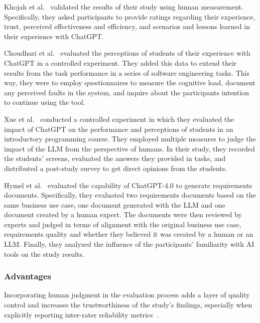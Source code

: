 Khojah et al.~\cite{DBLP:journals/pacmse/KhojahM0N24} validated the results of their study using human measurement.
Specifically, they asked participants to provide ratings regarding their experience, trust, perceived effectiveness and efficiency, and scenarios and lessons learned in their experience with ChatGPT.

Choudhuri et al.~\cite{DBLP:conf/icse/ChoudhuriLSGS24} evaluated the perceptions of students of their experience with ChatGPT in a controlled experiment.
They added this data to extend their results from the task performance in a series of software engineering tasks.
This way, they were to employ questionnaires to measure the cognitive load, document any perceived faults in the system, and inquire about the participants intention to continue using the tool.

Xue et al.~\cite{DBLP:conf/icse/XueCBTH24} conducted a controlled experiment in which they evaluated the impact of ChatGPT on the performance and perceptions of students in an introductory programming course.
They employed multiple measures to judge the impact of the LLM from the perspective of humans.
In their study, they recorded the students' screens, evaluated the answers they provided in tasks, and distributed a post-study survey to get direct opinions from the students.

Hymel et al.~\cite{hymel2025analysisllmsvshuman} evaluated the capability of ChatGPT-4.0 to generate requirements documents. 
Specifically, they evaluated two requirements documents based on the same business use case, one document generated with the LLM and one document created by a human expert.
The documents were then reviewed by experts and judged in terms of alignment with the original business use case, requirements quality and whether they believed it was created by a human or an LLM.
Finally, they analyzed the influence of the participants' familiarity with AI tools on the study results.

\subsubsection{Advantages}

Incorporating human judgment in the evaluation process adds a layer of quality control and increases the trustworthiness of the study's findings, especially when explicitly reporting inter-rater reliability metrics~\cite{khraisha2024canlargelanguagemodelshumans}.

